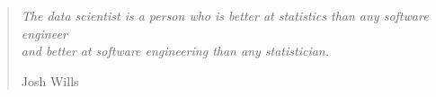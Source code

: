 \documentclass[a4paper, nobind]{templates/ociamthesis}
\theoremstyle{definition}
\theoremstyle{definition}
\theoremstyle{definition}
\theoremstyle{remark}
\begin{document}
\begin{romanpages}



\begin{frontespizio}
  \begin{Preambolo*}
    \renewcommand {\frontinstitutionfont } {\fontsize {20}{21}\bfseries }
    \renewcommand {\frontdivisionfont } {\fontsize {16}{23}\normalfont }
    \renewcommand {\frontpretitlefont } {\fontsize {16}{23}\scshape }
    \renewcommand {\fronttitlefont } {\fontsize {24}{27}\bfseries }
    \renewcommand {\frontfixednamesfont} {\fontsize {16}{23}\normalfont }
    \renewcommand {\frontnamesfont} {\fontsize {16}{23}\bfseries }
    \renewcommand {\frontfootfont} {\fontsize {14}{20}\bfseries }
  \end{Preambolo*}
  
\end{frontespizio}




\null\newpage


  \begin{quote}
    \begin{flushright}
      \textit{The data scientist is a person who is better at statistics than any software engineer\\
and better at software engineering than any statistician.}
    
      Josh Wills
    \end{flushright}
  \end{quote}



\end{romanpages}
\end{document}
